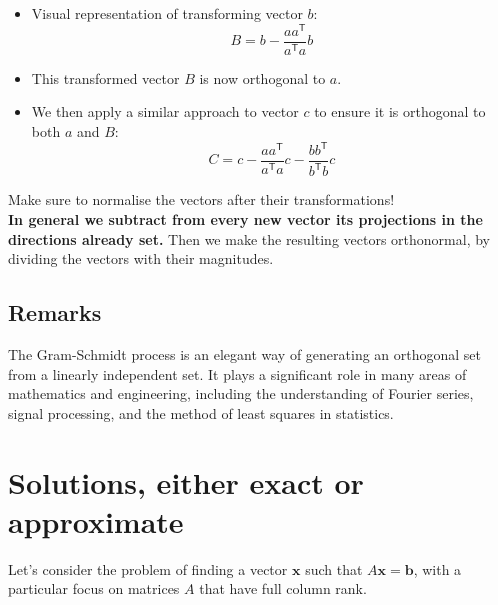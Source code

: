 \begin{itemize}
    \item Visual representation of transforming vector $b$:
    \begin{equation}
        B = b - \frac{a a^\mathsf{T}}{a^\mathsf{T}a}b
    \end{equation}
    \item This transformed vector $B$ is now orthogonal to $a$.
    \item We then apply a similar approach to vector $c$ to ensure it is orthogonal to both $a$ and $B$:
    \begin{equation}
        C = c - \frac{a a^\mathsf{T}}{a^\mathsf{T}a}c - \frac{b b^\mathsf{T}}{b^\mathsf{T}b}c
    \end{equation}
\end{itemize}
Make sure to normalise the vectors after their transformations!\\
\textbf{In general we subtract from every new vector its projections in the directions already set.} Then we make the resulting vectors orthonormal, by dividing the vectors with their magnitudes.

\subsection*{Remarks}

The Gram-Schmidt process is an elegant way of generating an orthogonal set from a linearly independent set. It plays a significant role in many areas of mathematics and engineering, including the understanding of Fourier series, signal processing, and the method of least squares in statistics.

\section{Solutions, either exact or approximate}


Let's consider the problem of finding a vector \( \mathbf{x} \) such that \( A\mathbf{x} = \mathbf{b} \), with a particular focus on matrices \( A \) that have full column rank.

